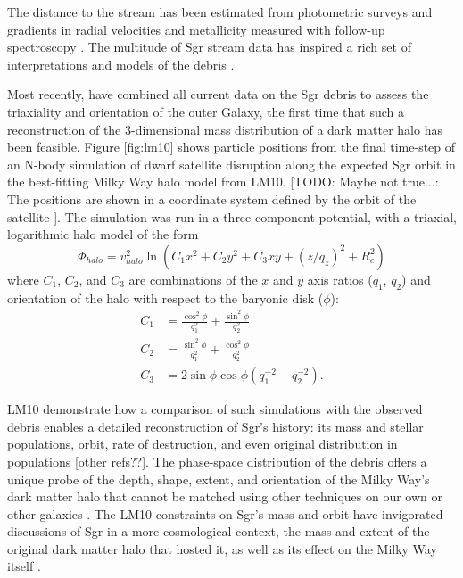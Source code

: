 \documentclass[preprint]{aastex}
\begin{document}
The distance to the stream has been estimated from photometric surveys
\citep[e.g.,][]{martinezdelgado2004} and gradients in radial
velocities and metallicity measured with follow-up spectroscopy
\citep[e.g.,][]{majewski2004, vivas2005, bellazzini2006, chou2007,
  chou2010, keller2010, carlin2012}. The multitude of Sgr stream data
has inspired a rich set of interpretations and models of the debris
\citep[e.g.,][]{johnston1999, helmi2004, law2005, fellhauer2006,
  law2010}.

Most recently, \citet[][hereafter LM10]{law2010} have combined all
current data on the Sgr debris to assess the triaxiality and orientation
of the outer Galaxy, the first time that such a reconstruction of
the 3-dimensional mass distribution of a dark matter halo has been
feasible. Figure \ref{fig:lm10} shows particle positions from the final time-step of an N-body simulation of dwarf satellite disruption along the expected Sgr
orbit in the best-fitting Milky Way halo model from LM10. [TODO: Maybe not true...: The positions are shown in a coordinate system defined
by the orbit of the satellite \citep{majewski2004}]. The
simulation was run in a three-component potential, with a triaxial,
logarithmic halo model of the form
\begin{equation}
  \Phi_{halo} = v_{halo}^2 \ln(C_1 x^2 + C_2 y^2 + C_3 xy + (z/q_z)^2 + R_c^2)
\end{equation}
where $C_1$, $C_2$, and $C_3$ are combinations of the $x$ and $y$ axis ratios ($q_1$, $q_2$) and orientation of the halo with respect to the baryonic disk ($\phi$):
\begin{align}
  C_1 &= \frac{\cos^2\phi}{q_1^2} + \frac{\sin^2\phi}{q_2^2}\\
  C_2 &= \frac{\sin^2\phi}{q_1^2} + \frac{\cos^2\phi}{q_2^2}\\
  C_3 &= 2\sin\phi\cos\phi \left(q_1^{-2} - q_2^{-2}\right).
\end{align}

LM10 demonstrate how a comparison of such simulations with the
observed debris enables a detailed reconstruction of Sgr's history:  
its mass and stellar populations, orbit, rate of destruction, and
even original distribution in populations [other refs??]. The phase-space distribution of the debris offers a unique probe of
the depth, shape, extent, and orientation of the Milky Way's dark
matter halo that cannot be matched using other techniques on our own
or other galaxies \citep[e.g.,][]{ibata2001}. The LM10 constraints on
Sgr's mass and orbit have invigorated discussions of Sgr in a more
cosmological context, the mass and extent of the original dark matter
halo that hosted it, as well as its effect on the Milky Way itself
\citep{bailin2003,purcell2011,micheldansac2011,gomez2012}.
\end{document}
